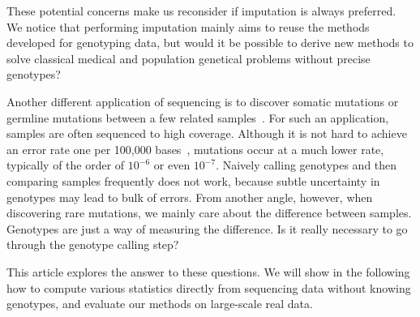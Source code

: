 \documentclass{bioinfo}
\begin{document}
These potential concerns make us reconsider if imputation is always preferred.
We notice that performing imputation mainly aims to reuse the methods developed
for genotyping data, but would it be possible to derive new methods to solve
classical medical and population genetical problems without precise genotypes?

Another different application of sequencing is to discover somatic mutations or
germline mutations between a few related
samples~\citep{Ley:2008ve,Mardis:2009qf,Shah:2009cr,Pleasance:2010bh,Pleasance:2010dq,Roach:2010oq,Conrad:2011kx}.  For such an application, samples
are often sequenced to high coverage.  Although it is not hard to achieve an
error rate one per 100,000 bases~\citep{Bentley:2008cr}, mutations occur at a
much lower rate, typically of the order of $10^{-6}$ or even $10^{-7}$. Naively
calling genotypes and then comparing samples frequently does not work, because
subtle uncertainty in genotypes may lead to bulk of errors. From another angle,
however, when discovering rare mutations, we mainly care about the difference
between samples. Genotypes are just a way of measuring the difference. Is it
really necessary to go through the genotype calling step?

This article explores the answer to these questions. We will show in the
following how to compute various statistics directly from sequencing data
without knowing genotypes, and evaluate our methods on large-scale real data.
\end{document}
